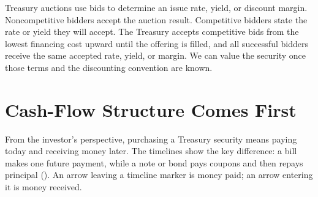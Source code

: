 \documentclass[11pt]{article}
\begin{document}
Treasury auctions use bids to determine an issue rate, yield, or discount margin. Noncompetitive bidders accept the auction result. Competitive bidders state the rate or yield they will accept. The Treasury accepts competitive bids from the lowest financing cost upward until the offering is filled, and all successful bidders receive the same accepted rate, yield, or margin. We can value the security once those terms and the discounting convention are known.

\section{Cash-Flow Structure Comes First}

From the investor's perspective, purchasing a Treasury security means paying today and receiving money later. The timelines show the key difference: a bill makes one future payment, while a note or bond pays coupons and then repays principal (). An arrow leaving a timeline marker is money paid; an arrow entering it is money received.
\end{document}
